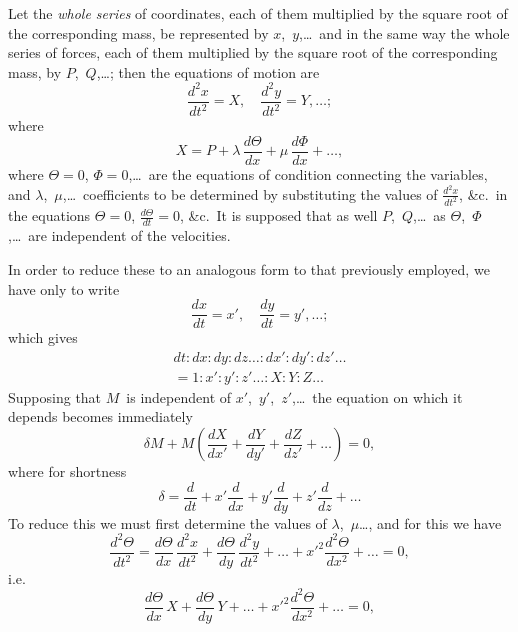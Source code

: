 \documentclass[11pt,a4paper]{book}
\begin{document}
Let the \textit{whole series} of coordinates, each of them multiplied by the square root of the corresponding mass, be represented by $x$,~$y$,\ldots\ and in the same way the whole series of forces, each of them multiplied by the square root of the corresponding mass, by $P$,~$Q$,\ldots; then the equations of motion are
\[
\frac{d^2x}{dt^2} = X, \quad \frac{d^2y}{dt^2} = Y, \ldots;
\]
where
\[
X = P + \lambda\,\frac{d\Theta}{dx} + \mu\,\frac{d\Phi}{dx} + \ldots,
\]
where $\Theta = 0$, $\Phi = 0$,\ldots\ are the equations of condition connecting the variables, and $\lambda$,~$\mu$,\ldots\ coefficients to be determined by substituting the values of $\frac{d^2x}{dt^2}$, \&c.\ in the equations $\Theta = 0$, $\frac{d\Theta}{dt} = 0$, \&c.\ It is supposed that as well $P$,~$Q$,\ldots\ as $\Theta$,~$\Phi$,\ldots\ are independent of the velocities.

\newpage
In order to reduce these to an analogous form to that previously employed, we have only to write
\[
\frac{dx}{dt} = x', \quad \frac{dy}{dt} = y', \ldots;
\]
which gives
\begin{multline*}
dt : dx : dy : dz\ldots : dx' : dy' : dz'\ldots \\
= 1 : x' : y' : z'\ldots : X : Y : Z\ldots
\end{multline*}
Supposing that $M$~is independent of $x'$,~$y'$,~$z'$,\ldots\ the equation on which it depends becomes immediately
\[
\delta M + M\left(\frac{dX}{dx'} + \frac{dY}{dy'} + \frac{dZ}{dz'} + \ldots\right) = 0,
\]
where for shortness
\[
\delta = \frac{d}{dt} + x'\frac{d}{dx} + y'\frac{d}{dy} + z'\frac{d}{dz} + \ldots
\]
To reduce this we must first determine the values of $\lambda$,~$\mu$\ldots, and for this we have
\[
\frac{d^2\Theta}{dt^2} = \frac{d\Theta}{dx}\,\frac{d^2x}{dt^2} + \frac{d\Theta}{dy}\,\frac{d^2y}{dt^2} + \ldots + x'^2\frac{d^2\Theta}{dx^2} + \ldots = 0,
\]
i.e.
\[
\frac{d\Theta}{dx}\,X + \frac{d\Theta}{dy}\,Y + \ldots + x'^2\frac{d^2\Theta}{dx^2} + \ldots = 0,
\]
\end{document}
